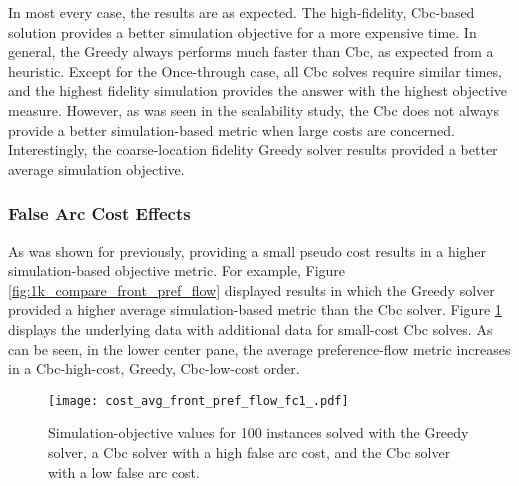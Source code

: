 In most every case, the results are as expected. The high-fidelity, Cbc-based
solution provides a better simulation objective for a more expensive time. In
general, the Greedy always performs much faster than Cbc, as expected from a
heuristic. Except for the Once-through case, all Cbc solves require similar
times, and the highest fidelity simulation provides the answer with the highest
objective measure. However, as was seen in the scalability study, the Cbc does
not always provide a better simulation-based metric when large costs are
concerned. Interestingly, the coarse-location fidelity Greedy solver results
provided a better average simulation objective.

\subsubsection{False Arc Cost Effects}

As was shown for previously, providing a small pseudo cost results in a higher
simulation-based objective metric. For example, Figure
\ref{fig:1k_compare_front_pref_flow} displayed results in which the Greedy
solver provided a higher average simulation-based metric than the Cbc
solver. Figure \ref{fig:cost_avg_front_pref_flow_fc1_} displays the underlying
data with additional data for small-cost Cbc solves. As can be seen, in the
lower center pane, the average preference-flow metric increases in a
Cbc-high-cost, Greedy, Cbc-low-cost order.

\begin{figure}[h!]
  \begin{center}
    \texttt{[image: cost\_avg\_front\_pref\_flow\_fc1\_.pdf]}
    \caption{
      \label{fig:cost_avg_front_pref_flow_fc1_}
      Simulation-objective values for 100 instances solved with the Greedy
      solver, a Cbc solver with a high false arc cost, and the Cbc solver with a
      low false arc cost.}
  \end{center}
\end{figure}




